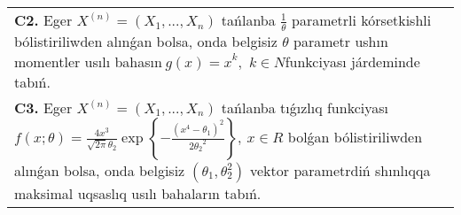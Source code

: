 \documentclass{article}
\begin{document}
\begin{tabular}{m{17cm}}
 \\
\textbf{C2.} 
Eger \(X^{(n)} = \left( X_{1},...,X_{n} \right)\) tańlanba \(\frac{1}{\theta}\) parametrli kórsetkishli bólistiriliwden alınǵan bolsa, onda belgisiz \(\theta\) parametr ushın momentler usılı bahasın\({\ g(x) = x}^{k},\) \(k \in N\)funkciyası járdeminde tabıń.
 \\
\textbf{C3.} 
Eger \(X^{(n)} = \left( X_{1},...,X_{n} \right)\) tańlanba tıǵızlıq funkciyası
$f(x;\theta) = \frac{4x^{3}}{\sqrt{2\pi}\theta_{2}}\exp\left\{ - \frac{\left( x^{4} - \theta_{1} \right)^{2}}{2{\theta_{2}}^{2}} \right\},\ x \in R$
bolǵan bólistiriliwden alınǵan bolsa, onda belgisiz \(\left( \theta_{1},\theta_{2}^{2} \right)\) vektor parametrdiń shınlıqqa maksimal uqsaslıq usılı bahaların tabıń.
 \\

\end{tabular}
\vspace{1cm}
\end{document}
